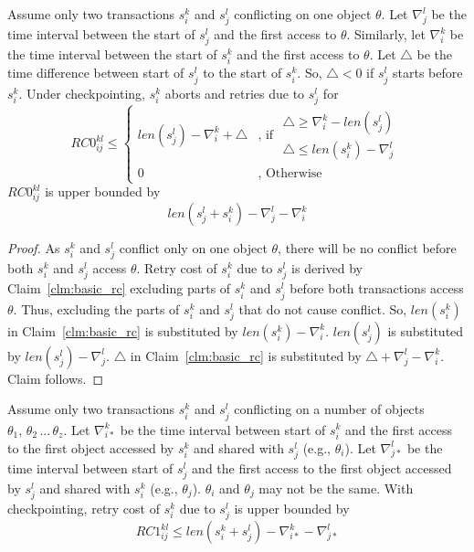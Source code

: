 \begin{clm}\label{clm:2_tx_cp_retry_cost}
Assume only two transactions $s_i^k$ and $s_j^l$ conflicting on one object $\theta$. Let $\nabla_{j}^{l}$ be the time interval between the start of $s_{j}^{l}$ and the first access to $\theta$. Similarly, let $\nabla_{i}^{k}$ be the time interval between the start of $s_i^k$ and the first access to $\theta$. Let $\triangle$ be the time difference between start of $s_j^l$ to the start of $s_i^k$. So, $\triangle < 0$ if $s_j^l$ starts before $s_i^k$. Under checkpointing, $s_{i}^{k}$ aborts and retries due to $s_{j}^{l}$
for 
\begin{equation}
RC0_{ij}^{kl} \le \begin{cases}
len\left(s_{j}^{l}\right)-\nabla_{i}^{k}+\triangle & \mbox{, if }\begin{gathered}\triangle\ge\nabla_{i}^{k}-len\left(s_{j}^{l}\right)\\
\triangle\le len\left(s_{i}^{k}\right)-\nabla_{j}^{l}
\end{gathered}
\\
0 & \mbox{, Otherwise}
\end{cases}\label{eq:2_tx_cp_retry_cost}
\end{equation}
%
$RC0_{ij}^{kl}$ is upper bounded by 
\begin{equation}
len\left(s_{j}^{l}+s_{i}^{k}\right)-\nabla_{j}^{l}-\nabla_{i}^{k}\label{eq:rc0_upper_bound}
\end{equation}

\end{clm}
%
\begin{proof}
%
As $s_i^k$ and $s_j^l$ conflict only on one object $\theta$, there will be no conflict before both $s_i^k$ and $s_j^l$ access $\theta$. Retry cost of $s_i^k$ due to $s_j^l$ is derived by Claim~\ref{clm:basic_rc} excluding parts of $s_i^k$ and $s_j^l$ before both transactions access $\theta$. Thus, excluding the parts of $s_i^k$ and $s_j^l$ that do not cause conflict. So, $len\left(s_i^k\right)$ in Claim~\ref{clm:basic_rc} is substituted by $len\left(s_i^k\right)-\nabla_i^k$. $len\left(s_j^l\right)$ is substituted by $len\left(s_j^l\right)-\nabla_j^l$. $\triangle$ in Claim~\ref{clm:basic_rc} is substituted by $\triangle+\nabla_j^l-\nabla_i^k$. Claim follows.
%
\end{proof}
%
\begin{clm}\label{clm:rc1_upper_bound}
%
Assume only two transactions $s_i^k$ and $s_j^l$ conflicting on a number of objects $\theta_1,\,\theta_2\,...\,\theta_z$. Let $\nabla_{i*}^k$ be the time interval between start of $s_i^k$ and the first access to the first object accessed by $s_i^k$ and shared with $s_j^l$ (e.g., $\theta_i$). Let $\nabla_{j*}^l$ be the time interval between start of $s_j^l$ and the first access to the first object accessed by $s_j^l$ and shared with $s_i^k$ (e.g., $\theta_j$). $\theta_i$ and $\theta_j$ may not be the same. With checkpointing, retry cost of $s_i^k$ due to $s_j^l$ is upper bounded by 
%
\begin{equation}
RC1_{ij}^{kl} \le len\left(s_i^k+s_j^l\right)-\nabla_{i*}^k-\nabla_{j*}^l
\label{eq:rc1_upper_bound}
\end{equation}
%
\end{clm}
